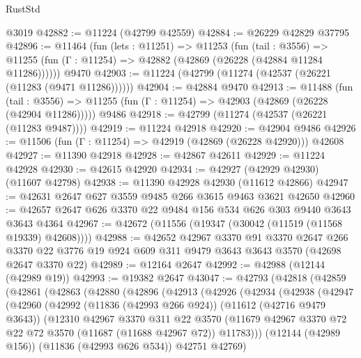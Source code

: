 \begin{lexlean}{RustStd}
\begin{coremodule}
    @3019
@42882 := @11224 (@42799 @42559)
@42884 := @26229 @42829 @37795
@42896 := @11464
    (fun (lets : @11251) =>
    @11253
      (fun (tail : @3556) =>
      @11255 (fun (Γ : @11254) => @42882 (@42869 (@26228 (@42884 @11284 @11286))))))
    @9470
@42903 := @11224 (@42799 (@11274 (@42537 (@26221 (@11283 (@9471 @11286))))))
@42904 := @42884 @9470
@42913 := @11488
    (fun (tail : @3556) => @11255 (fun (Γ : @11254) => @42903 (@42869 (@26228 (@42904 @11286)))))
    @9486
@42918 := @42799 (@11274 (@42537 (@26221 (@11283 @9487))))
@42919 := @11224 @42918
@42920 := @42904 @9486
@42926 := @11506 (fun (Γ : @11254) => @42919 (@42869 (@26228 @42920))) @42608
@42927 := @11390 @42918
@42928 := @42867 @42611
@42929 := @11224 @42928
@42930 := @42615 @42920
@42934 := @42927 (@42929 @42930) (@11607 @42798)
@42938 := @11390 @42928 @42930 (@11612 @42866)
@42947 := @42631 @2647 @627 @3559 @9485 @266 @3615 @9463 @3621 @42650
@42960 := @42657 @2647 @626 @3370 @22 @9484 @156 @534 @626 @303 @9440 @3643 @3643 @4364
@42967 := @42672 (@11556 (@19347 (@30042 (@11519 (@11568 @19339) @42608))))
@42988 := @42652
    @42967
    @3370
    @91
    @3370
    @2647
    @266
    @3370
    @22
    @3776
    @19
    @924
    @609
    @311
    @9479
    @3643
    @3643
    @3570
    (@42698 @2647 @3370 @22)
@42989 := @12164 @2647
@42992 := @42988 (@12144 (@42989 @19))
@42993 := @19382 @2647
@43047 := @42793
    (@42818
      (@42859
        (@42861
          (@42863
            (@42880
              (@42896
                (@42913
                  (@42926
                    (@42934
                      (@42938
                        (@42947
                          (@42960
                            (@42992
                              (@11836 (@42993 @266 @924))
                              (@11612 (@42716 @9479 @3643))
                              (@12310
                                @42967
                                @3370
                                @311
                                @22
                                @3570
                                (@11679
                                  @42967
                                  @3370
                                  @72
                                  @22
                                  @72
                                  @3570
                                  (@11687 (@11688 @42967 @72))
                                  @11783)))
                            (@12144 (@42989 @156))
                            (@11836 (@42993 @626 @534))
                            @42751
                            @42769)

\end{coremodule}
\end{lexlean}
